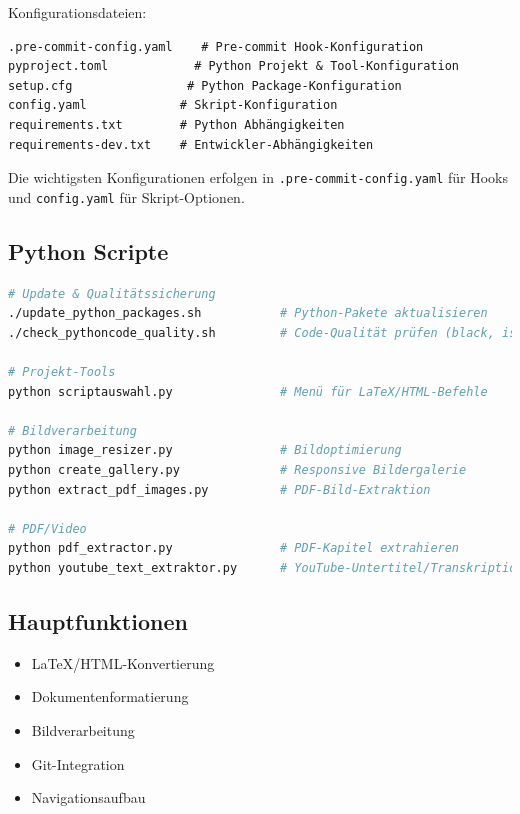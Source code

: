 \documentclass{vorlage-design-main}
\begin{document}
Konfigurationsdateien:

\begin{lstlisting}
.pre-commit-config.yaml    # Pre-commit Hook-Konfiguration
pyproject.toml            # Python Projekt & Tool-Konfiguration
setup.cfg                # Python Package-Konfiguration
config.yaml             # Skript-Konfiguration
requirements.txt        # Python Abhängigkeiten
requirements-dev.txt    # Entwickler-Abhängigkeiten
\end{lstlisting}

Die wichtigsten Konfigurationen erfolgen in
\verb|.pre-commit-config.yaml| für Hooks und
\verb|config.yaml| für Skript-Optionen.

\subsection{Python Scripte}\label{python-scripte}

\begin{lstlisting}[language=bash]
# Update & Qualitätssicherung
./update_python_packages.sh           # Python-Pakete aktualisieren
./check_pythoncode_quality.sh         # Code-Qualität prüfen (black, isort, flake8, mypy)

# Projekt-Tools
python scriptauswahl.py               # Menü für LaTeX/HTML-Befehle

# Bildverarbeitung
python image_resizer.py               # Bildoptimierung
python create_gallery.py              # Responsive Bildergalerie
python extract_pdf_images.py          # PDF-Bild-Extraktion

# PDF/Video
python pdf_extractor.py               # PDF-Kapitel extrahieren
python youtube_text_extraktor.py      # YouTube-Untertitel/Transkription
\end{lstlisting}

\subsection{Hauptfunktionen}\label{hauptfunktionen}

\begin{itemize}

\item
  LaTeX/HTML-Konvertierung
\item
  Dokumentenformatierung
\item
  Bildverarbeitung
\item
  Git-Integration
\item
  Navigationsaufbau
\end{itemize}
\end{document}
